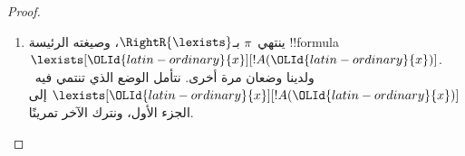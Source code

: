 \documentclass[../../../include/open-logic-section]{subfiles}
\begin{document}
\begin{proof}
\begin{enumerate}
    ويعطينا فرض الاستقراء~$\Lang L(!C_{\OLMathNumeral{1}}) \subseteq \Lang L({\OLId{greek-variable}{Gamma}}_{\OLMathNumeral{1}},
    {\OLId{greek-variable}{Delta}}_{\OLMathNumeral{1}}, !A({\OLId{latin-ordinary}{c}})) \cap \Lang L({\OLId{greek-variable}{Gamma}}_{\OLMathNumeral{2}}, {\OLId{greek-variable}{Delta}}_{\OLMathNumeral{2}})$. فلذلك لا يبقى
    إلا القلق بشأن~${\OLId{latin-ordinary}{c}}$: هل يجوز أن تظهر في~$!C_{\OLMathNumeral{1}}$؟ لا يمكن. فلو ظهرت
    فيها لكان كل من~${\OLId{latin-ordinary}{c}} \in \Lang L({\OLId{greek-variable}{Gamma}}_{\OLMathNumeral{1}}, {\OLId{greek-variable}{Delta}}_{\OLMathNumeral{1}}, !A({\OLId{latin-ordinary}{c}}))$، وهو
    صحيح، و${\OLId{latin-ordinary}{c}} \in \Lang L({\OLId{greek-variable}{Gamma}}_{\OLMathNumeral{2}}, {\OLId{greek-variable}{Delta}}_{\OLMathNumeral{2}})$. غير أن~${\OLId{latin-ordinary}{c}}$ كانت عندئذ
    ستظهر في نتيجة استدلال~$\RightR{\lforall}$ في~$\pi$، خلافًا لشرط
    المتغير المميز.

    والحالة الأخرى مماثلة.

    \item ينتهي~$\pi$ بـ$\RightR{\lexists}$، وصيغته الرئيسة
    !!{formula}~$\lexists[{\OLId{latin-ordinary}{x}}][!A({\OLId{latin-ordinary}{x}})]$. ولدينا وضعان مرة أخرى. نتأمل
    الوضع الذي تنتمي فيه~$\lexists[{\OLId{latin-ordinary}{x}}][!A({\OLId{latin-ordinary}{x}})]$ إلى الجزء الأول، ونترك
    الآخر تمرينًا.


\end{enumerate}
\end{proof}
\end{document}
